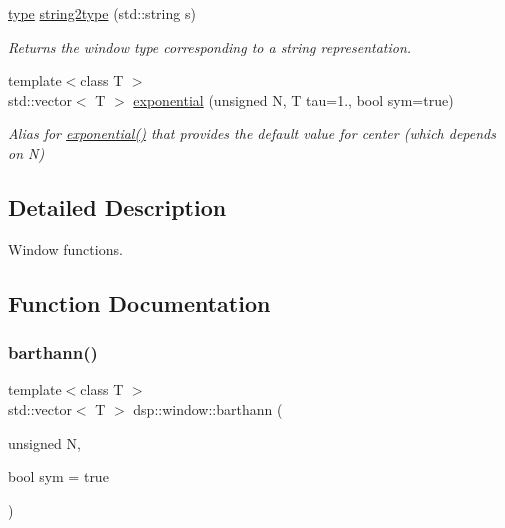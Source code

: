 \begin{DoxyCompactItemize}
\mbox{\hyperlink{namespacedsp_1_1window_a1cc0dcec4aa9e12640771bdf41f695b8}{type}} \mbox{\hyperlink{namespacedsp_1_1window_a34a63560363037f3754daa895c9821bc}{string2type}} (std\+::string s)
\begin{DoxyCompactList}\small\item\em Returns the window type corresponding to a string representation. \end{DoxyCompactList}\item 
\mbox{\label{namespacedsp_1_1window_ab29f6b0c8bbe02e35dfc9abcbd64dd69}} 
{\footnotesize template$<$class T $>$ }\\std\+::vector$<$ T $>$ \mbox{\hyperlink{namespacedsp_1_1window_ab29f6b0c8bbe02e35dfc9abcbd64dd69}{exponential}} (unsigned N, T tau=1., bool sym=true)
\begin{DoxyCompactList}\small\item\em Alias for \mbox{\hyperlink{namespacedsp_1_1window_a2aa108b39f9af85531a2870fd0229df6}{exponential()}} that provides the default value for center (which depends on N) \end{DoxyCompactList}\end{DoxyCompactItemize}


\subsection{Detailed Description}
Window functions. 

\subsection{Function Documentation}
\mbox{\label{namespacedsp_1_1window_a706a651f4fc7da094026b341f20138bb}} 
\subsubsection{\texorpdfstring{barthann()}{barthann()}}
{\footnotesize\ttfamily template$<$class T $>$ \\
std\+::vector$<$ T $>$ dsp\+::window\+::barthann (\begin{DoxyParamCaption}\item[{unsigned}]{N,  }\item[{bool}]{sym = {\ttfamily true} }\end{DoxyParamCaption})}



